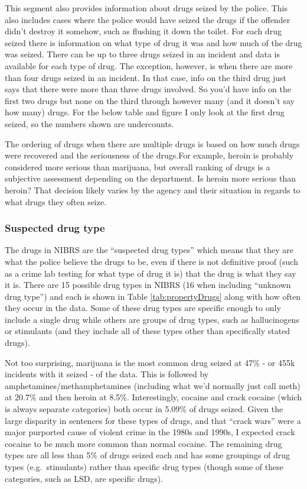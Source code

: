 \documentclass[
  12pt,
  openany]{book}
\begin{document}
This segment also provides information about drugs seized by the police. This also includes cases where the police would have seized the drugs if the offender didn't destroy it somehow, such as flushing it down the toilet. For each drug seized there is information on what type of drug it was and how much of the drug was seized. There can be up to three drugs seized in an incident and data is available for each type of drug. The exception, however, is when there are more than four drugs seized in an incident. In that case, info on the third drug just says that there were more than three drugs involved. So you'd have info on the first two drugs but none on the third through however many (and it doesn't say how many) drugs. For the below table and figure I only look at the first drug seized, so the numbers shown are undercounts.

The ordering of drugs when there are multiple drugs is based on how much drugs were recovered and the seriousness of the drugs.For example, heroin is probably considered more serious than marijuana, but overall ranking of drugs is a subjective assessment depending on the department. Is heroin more serious than heroin? That decision likely varies by the agency and their situation in regards to what drugs they often seize.

\hypertarget{suspected-drug-type}{%
\subsubsection{Suspected drug type}\label{suspected-drug-type}}

The drugs in NIBRS are the ``suspected drug types'' which means that they are what the police believe the drugs to be, even if there is not definitive proof (such as a crime lab testing for what type of drug it is) that the drug is what they say it is. There are 15 possible drug types in NIBRS (16 when including ``unknown drug type'') and each is shown in Table \ref{tab:propertyDrugs} along with how often they occur in the data. Some of these drug types are specific enough to only include a single drug while others are groups of drug types, such as hallucinogens or stimulants (and they include all of these types other than specifically stated drugs).

Not too surprising, marijuana is the most common drug seized at 47\% - or 455k incidents with it seized - of the data. This is followed by amphetamines/methamphetamines (including what we'd normally just call meth) at 20.7\% and then heroin at 8.5\%. Interestingly, cocaine and crack cocaine (which is always separate categories) both occur in 5.09\% of drugs seized. Given the large disparity in sentences for these types of drugs, and that ``crack wars'' were a major purported cause of violent crime in the 1980s and 1990s, I expected crack cocaine to be much more common than normal cocaine. The remaining drug types are all less than 5\% of drugs seized each and has some groupings of drug types (e.g.~stimulants) rather than specific drug types (though some of these categories, such as LSD, are specific drugs).
\end{document}
